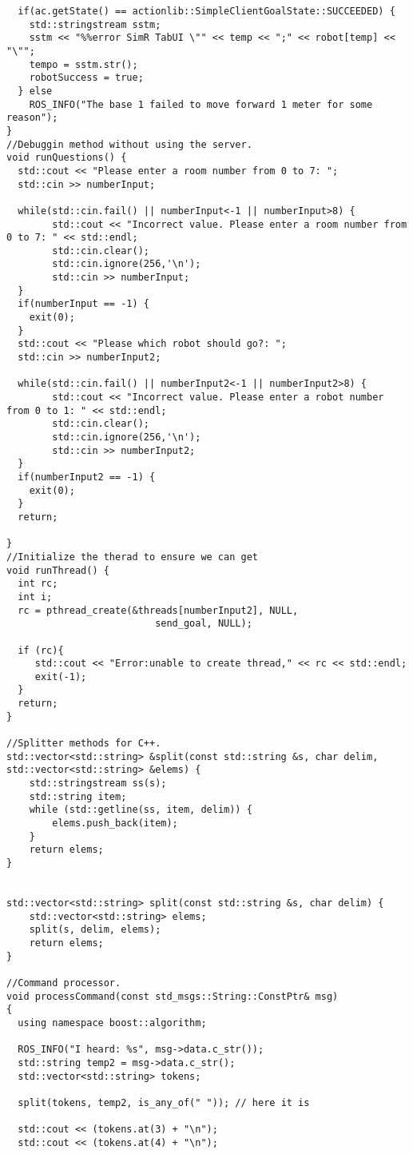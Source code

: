 \begin{lstlisting}
  if(ac.getState() == actionlib::SimpleClientGoalState::SUCCEEDED) {
    std::stringstream sstm;
    sstm << "%%error SimR TabUI \"" << temp << ";" << robot[temp] << "\"";
    tempo = sstm.str();
    robotSuccess = true;
  } else
    ROS_INFO("The base 1 failed to move forward 1 meter for some reason");
}
//Debuggin method without using the server.
void runQuestions() {
  std::cout << "Please enter a room number from 0 to 7: ";
  std::cin >> numberInput;

  while(std::cin.fail() || numberInput<-1 || numberInput>8) {
        std::cout << "Incorrect value. Please enter a room number from 0 to 7: " << std::endl;
        std::cin.clear();
        std::cin.ignore(256,'\n');
        std::cin >> numberInput;
  }
  if(numberInput == -1) {
    exit(0);
  }
  std::cout << "Please which robot should go?: ";
  std::cin >> numberInput2;
  
  while(std::cin.fail() || numberInput2<-1 || numberInput2>8) {
        std::cout << "Incorrect value. Please enter a robot number from 0 to 1: " << std::endl;
        std::cin.clear();
        std::cin.ignore(256,'\n');
        std::cin >> numberInput2;
  }
  if(numberInput2 == -1) {
    exit(0);
  }
  return;

}
//Initialize the therad to ensure we can get 
void runThread() {
  int rc;
  int i;
  rc = pthread_create(&threads[numberInput2], NULL, 
                          send_goal, NULL);  
  
  if (rc){
     std::cout << "Error:unable to create thread," << rc << std::endl;
     exit(-1);
  }
  return;
}

//Splitter methods for C++.
std::vector<std::string> &split(const std::string &s, char delim, std::vector<std::string> &elems) {
    std::stringstream ss(s);
    std::string item;
    while (std::getline(ss, item, delim)) {
        elems.push_back(item);
    }
    return elems;
}


std::vector<std::string> split(const std::string &s, char delim) {
    std::vector<std::string> elems;
    split(s, delim, elems);
    return elems;
}

//Command processor.
void processCommand(const std_msgs::String::ConstPtr& msg)
{
  using namespace boost::algorithm;

  ROS_INFO("I heard: %s", msg->data.c_str());
  std::string temp2 = msg->data.c_str();
  std::vector<std::string> tokens;

  split(tokens, temp2, is_any_of(" ")); // here it is

  std::cout << (tokens.at(3) + "\n");
  std::cout << (tokens.at(4) + "\n");


\end{lstlisting}
